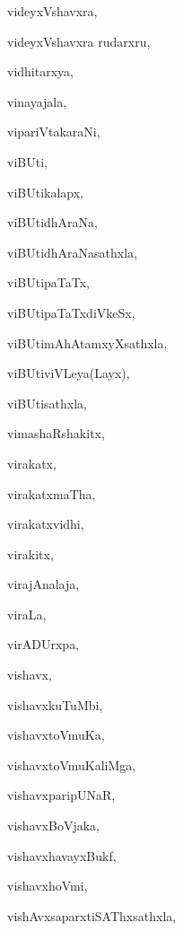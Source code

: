 \begin{multicols}{2}
{videyxVshavxra}, \pageref{videyxVshavxra}

{videyxVshavxra rudarxru}, \pageref{videyxVshavxrarudarxru}

{vidhitarxya}, \pageref{vidhitarxya}

{vinayajala}, \pageref{vinayajala}

{vipariVtakaraNi}, \pageref{vipariVtakaraNi}

{viBUti}, \pageref{viBUti}

{viBUtikalapx}, \pageref{viBUtikalapx}

{viBUtidhAraNa}, \pageref{viBUtidhAraNa}

{viBUtidhAraNasathxla}, \pageref{viBUtidhAraNasathxla}

{viBUtipaTaTx}, \pageref{viBUtipaTaTx}

{viBUtipaTaTxdiVkeSx}, \pageref{viBUtipaTaTxdiVkeSx}

{viBUtimAhAtamxyXsathxla}, \pageref{viBUtimAhAtamxyXsathxla}

{viBUtiviVLeya(Layx)}, \pageref{viBUtiviVLeyaLayx}

{viBUtisathxla}, \pageref{viBUtisathxla}

{vimashaRshakitx}, \pageref{vimashaRshakitx}

{virakatx}, \pageref{virakatx}

{virakatxmaTha}, \pageref{virakatxmaTha}

{virakatxvidhi}, \pageref{virakatxvidhi}

{virakitx}, \pageref{virakitx}

{virajAnalaja}, \pageref{virajAnalaja}

{viraLa}, \pageref{viraLa}

{virADUrxpa}, \pageref{virADUrxpa}

{vishavx}, \pageref{vishavx}

{vishavxkuTuMbi}, \pageref{vishavxkuTuMbi}

{vishavxtoVmuKa}, \pageref{vishavxtoVmuKa}

{vishavxtoVmuKaliMga}, \pageref{vishavxtoVmuKaliMga}

{vishavxparipUNaR}, \pageref{vishavxparipUNaR}

{vishavxBoVjaka}, \pageref{vishavxBoVjaka}

{vishavxhavayxBukf}, \pageref{vishavxhavayxBukf}

{vishavxhoVmi}, \pageref{vishavxhoVmi}

{vishAvxsaparxtiSAThxsathxla}, \pageref{vishAvxsaparxtiSAThxsathxla}


\end{multicols}
